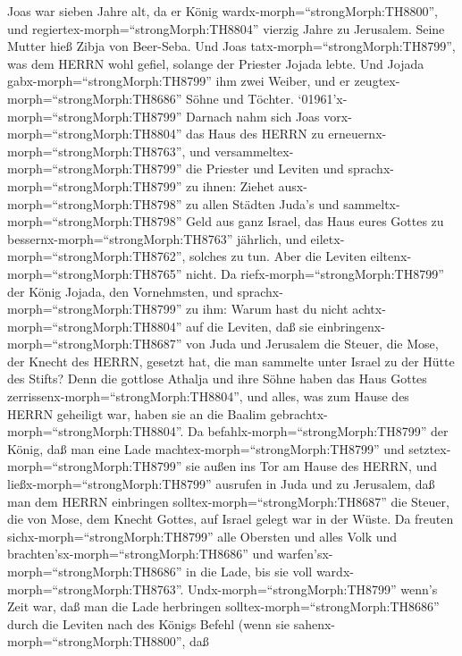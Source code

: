  Joas war sieben Jahre alt, da er König
wardx-morph=``strongMorph:TH8800'', und
regiertex-morph=``strongMorph:TH8804'' vierzig Jahre zu Jerusalem. Seine
Mutter hieß Zibja von Beer-Seba.  Und Joas
tatx-morph=``strongMorph:TH8799'', was dem HERRN wohl gefiel, solange
der Priester Jojada lebte.  Und Jojada
gabx-morph=``strongMorph:TH8799'' ihm zwei Weiber, und er
zeugtex-morph=``strongMorph:TH8686'' Söhne und Töchter. 
`01961'\textbar x-morph=``strongMorph:TH8799'' Darnach nahm sich Joas
vorx-morph=``strongMorph:TH8804'' das Haus des HERRN zu
erneuernx-morph=``strongMorph:TH8763'',  und
versammeltex-morph=``strongMorph:TH8799'' die Priester und Leviten und
sprachx-morph=``strongMorph:TH8799'' zu ihnen: Ziehet
ausx-morph=``strongMorph:TH8798'' zu allen Städten Juda's und
sammeltx-morph=``strongMorph:TH8798'' Geld aus ganz Israel, das Haus
eures Gottes zu bessernx-morph=``strongMorph:TH8763'' jährlich, und
eiletx-morph=``strongMorph:TH8762'', solches zu tun. Aber die Leviten
eiltenx-morph=``strongMorph:TH8765'' nicht.  Da
riefx-morph=``strongMorph:TH8799'' der König Jojada, den Vornehmsten,
und sprachx-morph=``strongMorph:TH8799'' zu ihm: Warum hast du nicht
achtx-morph=``strongMorph:TH8804'' auf die Leviten, daß sie
einbringenx-morph=``strongMorph:TH8687'' von Juda und Jerusalem die
Steuer, die Mose, der Knecht des HERRN, gesetzt hat, die man sammelte
unter Israel zu der Hütte des Stifts?  Denn die gottlose
Athalja und ihre Söhne haben das Haus Gottes
zerrissenx-morph=``strongMorph:TH8804'', und alles, was zum Hause des
HERRN geheiligt war, haben sie an die Baalim
gebrachtx-morph=``strongMorph:TH8804''.  Da
befahlx-morph=``strongMorph:TH8799'' der König, daß man eine Lade
machtex-morph=``strongMorph:TH8799'' und
setztex-morph=``strongMorph:TH8799'' sie außen ins Tor am Hause des
HERRN,  und ließx-morph=``strongMorph:TH8799'' ausrufen in
Juda und zu Jerusalem, daß man dem HERRN einbringen
solltex-morph=``strongMorph:TH8687'' die Steuer, die von Mose, dem
Knecht Gottes, auf Israel gelegt war in der Wüste.  Da
freuten sichx-morph=``strongMorph:TH8799'' alle Obersten und alles Volk
und brachten'sx-morph=``strongMorph:TH8686'' und
warfen'sx-morph=``strongMorph:TH8686'' in die Lade, bis sie voll
wardx-morph=``strongMorph:TH8763''. 
Undx-morph=``strongMorph:TH8799'' wenn's Zeit war, daß man die Lade
herbringen solltex-morph=``strongMorph:TH8686'' durch die Leviten nach
des Königs Befehl (wenn sie sahenx-morph=``strongMorph:TH8800'', daß
